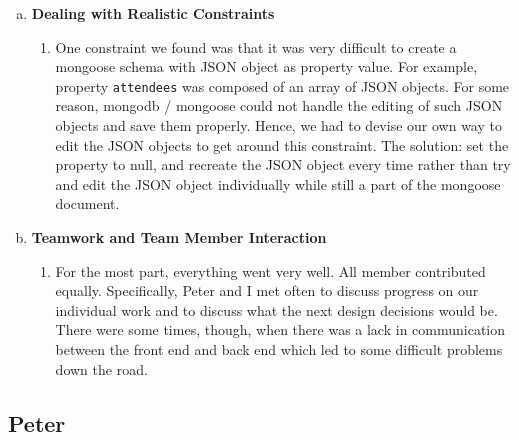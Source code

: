 \documentclass[11pt]{article}   %
\begin{document}
\begin{enumerate} [a)]
\begin{enumerate} [$\cdot$]
\end{enumerate}
\item {\bf Dealing with Realistic Constraints}
\begin{enumerate} [$\cdot$]
\item One constraint we found was that it was very difficult to create a mongoose schema with JSON object as property value. For example, property \texttt{attendees} was composed of an array of JSON objects. For some reason, mongodb / mongoose could not handle the editing of such JSON objects and save them properly. Hence, we had to devise our own way to edit the JSON objects to get around this constraint. The solution: set the property to null, and recreate the JSON object every time rather than try and edit the JSON object individually while still a part of the mongoose document.
\end{enumerate}
\item  {\bf Teamwork and Team Member Interaction}
\begin{enumerate} [$\cdot$]
\item For the most part, everything went very well. All member contributed equally. Specifically, Peter and I met often to discuss progress on our individual work and to discuss what the next design decisions would be. There were some times, though, when there was a lack in communication between the front end and back end which led to some difficult problems down the road.
\end{enumerate}
\end{enumerate}

\subsection*{Peter}
\end{document}
